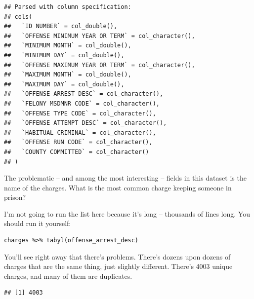 \documentclass[]{book}
\newenvironment{Shaded}{\begin{snugshade}}{\end{snugshade}}
\newcommand{\DataTypeTok}[1]{\textcolor[rgb]{0.13,0.29,0.53}{#1}}
\newcommand{\KeywordTok}[1]{\textcolor[rgb]{0.13,0.29,0.53}{\textbf{#1}}}
\newcommand{\NormalTok}[1]{#1}
\newcommand{\OperatorTok}[1]{\textcolor[rgb]{0.81,0.36,0.00}{\textbf{#1}}}
\newcommand{\OtherTok}[1]{\textcolor[rgb]{0.56,0.35,0.01}{#1}}
\newcommand{\StringTok}[1]{\textcolor[rgb]{0.31,0.60,0.02}{#1}}
\begin{document}
\begin{Shaded}
\end{Shaded}

\begin{verbatim}
## Parsed with column specification:
## cols(
##   `ID NUMBER` = col_double(),
##   `OFFENSE MINIMUM YEAR OR TERM` = col_character(),
##   `MINIMUM MONTH` = col_double(),
##   `MINIMUM DAY` = col_double(),
##   `OFFENSE MAXIMUM YEAR OR TERM` = col_character(),
##   `MAXIMUM MONTH` = col_double(),
##   `MAXIMUM DAY` = col_double(),
##   `OFFENSE ARREST DESC` = col_character(),
##   `FELONY MSDMNR CODE` = col_character(),
##   `OFFENSE TYPE CODE` = col_character(),
##   `OFFENSE ATTEMPT DESC` = col_character(),
##   `HABITUAL CRIMINAL` = col_character(),
##   `OFFENSE RUN CODE` = col_character(),
##   `COUNTY COMMITTED` = col_character()
## )
\end{verbatim}

The problematic -- and among the most interesting -- fields in this dataset is the name of the charges. What is the most common charge keeping someone in prison?

I'm not going to run the list here because it's long -- thousands of lines long. You should run it yourself:

\begin{verbatim}
charges %>% tabyl(offense_arrest_desc)
\end{verbatim}

You'll see right away that there's problems. There's dozens upon dozens of charges that are the same thing, just slightly different. There's 4003 unique charges, and many of them are duplicates.

\begin{Shaded}
\end{Shaded}

\begin{verbatim}
## [1] 4003
\end{verbatim}
\end{document}
